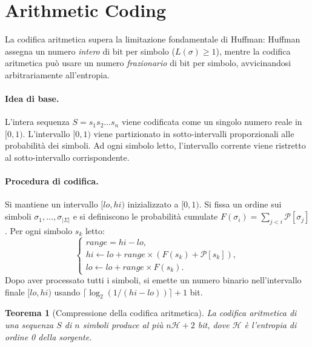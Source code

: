 \documentclass[12pt, a4paper, oneside]{book}
\theoremstyle{plain}
\newtheorem{teorema}{Teorema}[chapter]
\theoremstyle{definition}
\theoremstyle{remark}
\begin{document}
\section{Arithmetic Coding}
\label{sec:arithmetic-coding}

La codifica aritmetica supera la limitazione fondamentale di Huffman: Huffman assegna un numero \emph{intero} di bit per simbolo ($L(\sigma) \geq 1$), mentre la codifica aritmetica può usare un numero \emph{frazionario} di bit per simbolo, avvicinandosi arbitrariamente all'entropia.

\paragraph{Idea di base.}
L'intera sequenza $S = s_1 s_2 \ldots s_n$ viene codificata come un singolo numero reale in $[0, 1)$. L'intervallo $[0, 1)$ viene partizionato in sotto-intervalli proporzionali alle probabilità dei simboli. Ad ogni simbolo letto, l'intervallo corrente viene ristretto al sotto-intervallo corrispondente.

\paragraph{Procedura di codifica.}
Si mantiene un intervallo $[lo, hi)$ inizializzato a $[0, 1)$. Si fissa un ordine sui simboli $\sigma_1, \ldots, \sigma_{|\Sigma|}$ e si definiscono le probabilità cumulate $F(\sigma_i) = \sum_{j<i} \mathcal{P}[\sigma_j]$. Per ogni simbolo $s_k$ letto:
\[
\begin{cases}
\mathit{range} = hi - lo, \\
hi \leftarrow lo + \mathit{range} \times (F(s_k) + \mathcal{P}[s_k]), \\
lo \leftarrow lo + \mathit{range} \times F(s_k).
\end{cases}
\]
Dopo aver processato tutti i simboli, si emette un numero binario nell'intervallo finale $[lo, hi)$ usando $\lceil \log_2(1/(hi - lo)) \rceil + 1$ bit.

\begin{teorema}[Compressione della codifica aritmetica]
\label{thm:arithmetic-coding}
La codifica aritmetica di una sequenza $S$ di $n$ simboli produce al più $n\mathcal{H} + 2$ bit, dove $\mathcal{H}$ è l'entropia di ordine 0 della sorgente.
\end{teorema}
\end{document}
